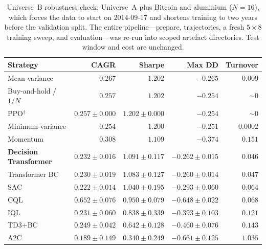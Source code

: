 \documentclass[11pt]{article}
\begin{document}
\begin{table}[h]
\centering
\caption{Universe~B robustness check: Universe~A plus Bitcoin and aluminium ($N=16$), which
forces the data to start on 2014-09-17 and shortens training to two years before the validation
split. The entire pipeline---prepare, trajectories, a fresh $5 \times 8$ training sweep, and
evaluation---was re-run into scoped artefact directories. Test window and cost are unchanged.}
\label{tab:universeb}
\small
\begin{tabular}{lrrrr}
\toprule
Strategy & CAGR & \textbf{Sharpe} & Max DD & Turnover \\
\midrule
Mean-variance        & $0.267$ & $\mathbf{1.202}$ & $-0.265$ & $0.009$ \\
Buy-and-hold / $1/N$ & $0.257$ & $1.202$ & $-0.254$ & ${\sim}0$ \\
PPO$^\dagger$        & $0.257 \pm 0.000$ & $1.202 \pm 0.000$ & $-0.254$ & ${\sim}0$ \\
Minimum-variance     & $0.254$ & $1.200$ & $-0.251$ & $0.0002$ \\
Momentum             & $0.308$ & $1.109$ & $-0.374$ & $0.151$ \\
\textbf{Decision Transformer} & $0.232 \pm 0.016$ & $1.091 \pm 0.117$ & $-0.262 \pm 0.015$ & $0.046$ \\
Transformer BC       & $0.230 \pm 0.019$ & $1.083 \pm 0.127$ & $-0.260 \pm 0.014$ & $0.047$ \\
SAC                  & $0.222 \pm 0.014$ & $1.040 \pm 0.195$ & $-0.293 \pm 0.060$ & $0.064$ \\
CQL                  & $\mathbf{0.652 \pm 0.076}$ & $0.950 \pm 0.079$ & $-0.648 \pm 0.022$ & $0.068$ \\
IQL                  & $0.231 \pm 0.060$ & $0.838 \pm 0.339$ & $-0.393 \pm 0.103$ & $0.121$ \\
TD3+BC               & $0.249 \pm 0.042$ & $0.642 \pm 0.128$ & $-0.460 \pm 0.076$ & $0.143$ \\
A2C                  & $0.189 \pm 0.149$ & $0.340 \pm 0.249$ & $-0.661 \pm 0.125$ & $1.035$ \\
\bottomrule
\end{tabular}
\end{table}
\end{document}
